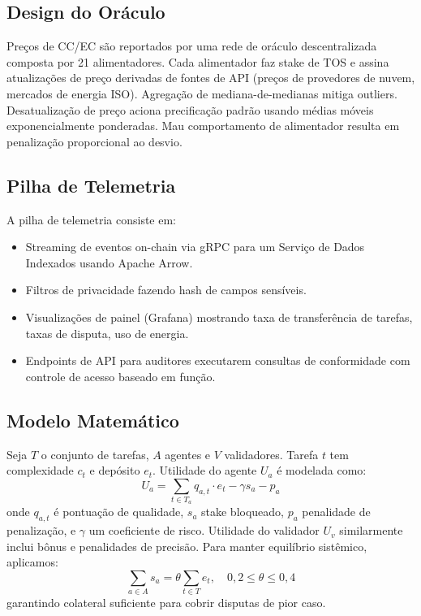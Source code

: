 \documentclass[11pt]{article}
\begin{document}
\subsection{Design do Oráculo}
Preços de CC/EC são reportados por uma rede de oráculo descentralizada composta por 21 alimentadores. Cada alimentador faz stake de TOS e assina atualizações de preço derivadas de fontes de API (preços de provedores de nuvem, mercados de energia ISO). Agregação de mediana-de-medianas mitiga outliers. Desatualização de preço aciona precificação padrão usando médias móveis exponencialmente ponderadas. Mau comportamento de alimentador resulta em penalização proporcional ao desvio.

\subsection{Pilha de Telemetria}
A pilha de telemetria consiste em:
\begin{itemize}[noitemsep]
  \item Streaming de eventos on-chain via gRPC para um Serviço de Dados Indexados usando Apache Arrow.
  \item Filtros de privacidade fazendo hash de campos sensíveis.
  \item Visualizações de painel (Grafana) mostrando taxa de transferência de tarefas, taxas de disputa, uso de energia.
  \item Endpoints de API para auditores executarem consultas de conformidade com controle de acesso baseado em função.
\end{itemize}

\subsection{Modelo Matemático}
Seja $T$ o conjunto de tarefas, $A$ agentes e $V$ validadores. Tarefa $t$ tem complexidade $c_t$ e depósito $e_t$. Utilidade do agente $U_a$ é modelada como:
\begin{equation}
U_a = \sum_{t \in T_a} q_{a,t}\cdot e_t - \gamma s_a - p_a\label{eq:agent-utility}
\end{equation}
onde $q_{a,t}$ é pontuação de qualidade, $s_a$ stake bloqueado, $p_a$ penalidade de penalização, e $\gamma$ um coeficiente de risco. Utilidade do validador $U_v$ similarmente inclui bônus e penalidades de precisão. Para manter equilíbrio sistêmico, aplicamos:
\begin{equation}
\sum_{a \in A} s_a = \theta \sum_{t \in T} e_t,\quad 0,2 \leq \theta \leq 0,4
\end{equation}
garantindo colateral suficiente para cobrir disputas de pior caso.
\end{document}
